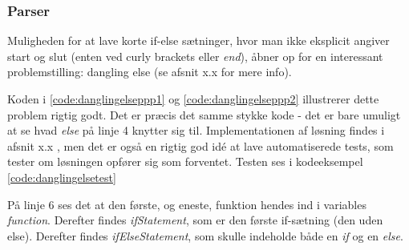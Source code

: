 \subsubsection{Parser}

Muligheden for at lave korte if-else sætninger, hvor man ikke eksplicit angiver start og slut (enten ved curly brackets  eller \textit{end}), åbner op for en interessant problemstilling: dangling else (se afsnit x.x for mere info). 



\noindent Koden i \ref{code:danglingelseppp1} og \ref{code:danglingelseppp2} illustrerer dette problem rigtig godt. Det er præcis det samme stykke kode - det er bare umuligt at se hvad \textit{else} på linje 4 knytter sig til. Implementationen af løsning findes i afsnit x.x , men det er også en rigtig god idé at lave automatiserede tests, som tester om løsningen opfører sig som forventet. Testen ses i kodeeksempel \ref{code:danglingelsetest}


\noindent På linje 6 ses det at den første, og eneste, funktion hendes ind i variables \textit{function}. Derefter findes \textit{ifStatement}, som er den første if-sætning (den uden else). Derefter findes \textit{ifElseStatement}, som skulle indeholde både en \textit{if} og en \textit{else}.